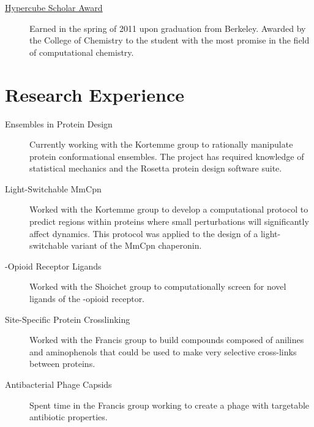 \documentclass{article}
\begin{document}
  \begin{description}
   \item[\href{http://chemistry.berkeley.edu/commencement/address/pdf/commencement-program-2011.pdf}{Hypercube 
   Scholar Award}] Earned in the spring of 2011 upon graduation from Berkeley.  
   Awarded by the College of Chemistry to the student with the most promise in 
   the field of computational chemistry.
  \end{description}

 \section*{Research Experience}

  \begin{description}
   \item[Ensembles in Protein Design] Currently working with the Kortemme group 
   to rationally manipulate protein conformational ensembles.  The project has 
   required knowledge of statistical mechanics and the Rosetta protein design 
   software suite.
   
   \item[Light-Switchable MmCpn] Worked with the Kortemme group to develop a 
   computational protocol to predict regions within proteins where small 
   perturbations will significantly affect dynamics.  This protocol was applied 
   to the design of a light-switchable variant of the MmCpn chaperonin.  

   \item[\textkappa{}-Opioid Receptor Ligands] Worked with the Shoichet group 
   to computationally screen for novel ligands of the \textkappa{}-opioid 
   receptor. 

   \item[Site-Specific Protein Crosslinking] Worked with the Francis group to 
   build compounds composed of anilines and aminophenols that could be used to 
   make very selective cross-links between proteins. 

   \item[Antibacterial Phage Capsids] Spent time in the Francis
   group working to create a phage with targetable antibiotic properties.
  \end{description}
\end{document}
